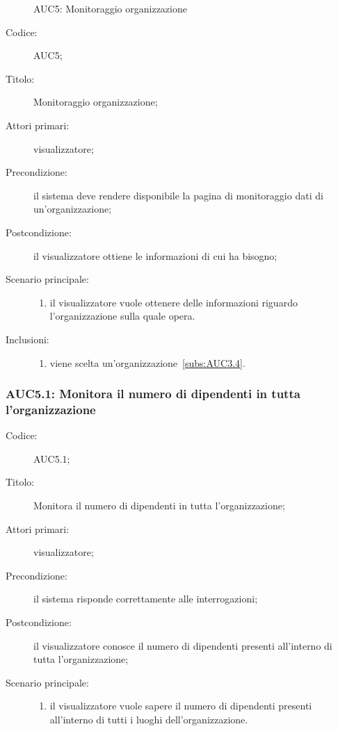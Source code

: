\documentclass[../../../analisi-dei-requisiti.tex]{subfiles}
\begin{document}
\begin{figure}[H]
  \centering
  \caption{AUC5: Monitoraggio organizzazione}%
  \label{fig:AUC5}
\end{figure}

\begin{description}
  \item[Codice:] AUC5;
  \item[Titolo:] Monitoraggio organizzazione;
  \item[Attori primari:] visualizzatore;
  \item[Precondizione:] il sistema deve rendere disponibile la pagina di monitoraggio dati di un'organizzazione;
  \item[Postcondizione:] il visualizzatore ottiene le informazioni di cui ha bisogno;
  \item[Scenario principale:]
  \begin{enumerate}
    \item il visualizzatore vuole ottenere delle informazioni riguardo l'organizzazione sulla quale opera.
  \end{enumerate}
  \item[Inclusioni:]
        \begin{enumerate}
          \item viene scelta un'organizzazione~\ref{subs:AUC3.4}.
        \end{enumerate}
\end{description}

\subsubsection{AUC5.1: Monitora il numero di dipendenti in tutta l'organizzazione}%
\label{subs:AUC5.1}
\begin{description}
  \item[Codice:] AUC5.1;
  \item[Titolo:] Monitora il numero di dipendenti in tutta l'organizzazione;
  \item[Attori primari:] visualizzatore;
  \item[Precondizione:] il sistema risponde correttamente alle interrogazioni;
  \item[Postcondizione:] il visualizzatore conosce il numero di dipendenti presenti all'interno di tutta l'organizzazione;
  \item[Scenario principale:]
  \begin{enumerate}
    \item il visualizzatore vuole sapere il numero di dipendenti presenti all'interno di tutti i luoghi dell'organizzazione.
  \end{enumerate}
\end{description}
\end{document}
